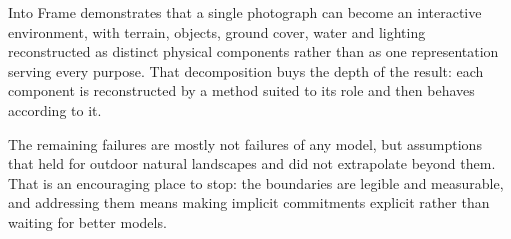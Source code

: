 Into Frame demonstrates that a single photograph can become an interactive
environment, with terrain, objects, ground cover, water and lighting reconstructed
as distinct physical components rather than as one representation serving every
purpose. That decomposition buys the depth of the result: each component is
reconstructed by a method suited to its role and then behaves according to it.

The remaining failures are mostly not failures of any model, but assumptions that
held for outdoor natural landscapes and did not extrapolate beyond them. That is an
encouraging place to stop: the boundaries are legible and measurable, and addressing
them means making implicit commitments explicit rather than waiting for better
models.
